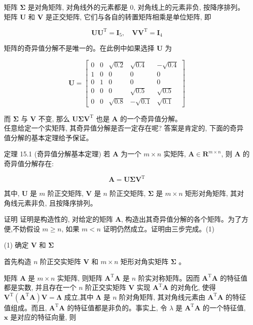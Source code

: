 \documentclass[10pt]{article}
\begin{document}
矩阵 $\boldsymbol{\Sigma}$ 是对角矩阵, 对角线外的元素都是 0, 对角线上的元素非负, 按降序排列。矩阵 $\boldsymbol{U}$ 和 $\boldsymbol{V}$ 是正交矩阵, 它们与各自的转置矩阵相乘是单位矩阵, 即

$$
\boldsymbol{U} \boldsymbol{U}^{\mathrm{T}}=\boldsymbol{I}_{5}, \quad \boldsymbol{V} \boldsymbol{V}^{\mathrm{T}}=\boldsymbol{I}_{4}
$$

矩阵的奇异值分解不是唯一的。在此例中如果选择 $\boldsymbol{U}$ 为

$$
\boldsymbol{U}=\left[\begin{array}{ccccc}
0 & 0 & \sqrt{0.2} & \sqrt{0.4} & -\sqrt{0.4} \\
1 & 0 & 0 & 0 & 0 \\
0 & 1 & 0 & 0 & 0 \\
0 & 0 & 0 & \sqrt{0.5} & \sqrt{0.5} \\
0 & 0 & \sqrt{0.8} & -\sqrt{0.1} & \sqrt{0.1}
\end{array}\right]
$$

而 $\boldsymbol{\Sigma}$ 与 $\boldsymbol{V}$ 不变, 那么 $\boldsymbol{U} \boldsymbol{\Sigma} \boldsymbol{V}^{\mathrm{T}}$ 也是 $\boldsymbol{A}$ 的一个奇异值分解。\\
任意给定一个实矩阵, 其奇异值分解是否一定存在呢? 答案是肯定的, 下面的奇异值分解的基本定理给予保证。

定理 15.1 (奇异值分解基本定理) 若 $\boldsymbol{A}$ 为一个 $m \times n$ 实矩阵, $\boldsymbol{A} \in \boldsymbol{R}^{m \times n}$, 则 $\boldsymbol{A}$ 的奇异值分解存在:


\begin{equation*}
\boldsymbol{A}=\boldsymbol{U} \boldsymbol{\Sigma} \boldsymbol{V}^{\mathrm{T}} \tag{15.2}
\end{equation*}


其中, $\boldsymbol{U}$ 是 $m$ 阶正交矩阵, $\boldsymbol{V}$ 是 $n$ 阶正交矩阵, $\boldsymbol{\Sigma}$ 是 $m \times n$ 矩形对角矩阵, 其对角线元素非负, 且按降序排列。

证明 证明是构造性的, 对给定的矩阵 $\boldsymbol{A}$, 构造出其奇异值分解的各个矩阵。为了方便,不妨假设 $m \geqslant n$, 如果 $m<n$ 证明仍然成立。证明由三步完成。(1)

(1) 确定 $\boldsymbol{V}$ 和 $\boldsymbol{\Sigma}$

首先构造 $n$ 阶正交实矩阵 $\boldsymbol{V}$ 和 $m \times n$ 矩形对角实矩阵 $\boldsymbol{\Sigma}$ 。

矩阵 $\boldsymbol{A}$ 是 $m \times n$ 实矩阵, 则矩阵 $\boldsymbol{A}^{\mathrm{T}} \boldsymbol{A}$ 是 $n$ 阶实对称矩阵。因而 $\boldsymbol{A}^{\mathrm{T}} \boldsymbol{A}$ 的特征值都是实数, 并且存在一个 $n$ 阶正交实矩阵 $\boldsymbol{V}$ 实现 $\boldsymbol{A}^{\mathrm{T}} \boldsymbol{A}$ 的对角化, 使得 $\boldsymbol{V}^{\mathrm{T}}\left(\boldsymbol{A}^{\mathrm{T}} \boldsymbol{A}\right) \boldsymbol{V}=\boldsymbol{\Lambda}$ 成立,其中 $\boldsymbol{\Lambda}$ 是 $n$ 阶对角矩阵, 其对角线元素由 $\boldsymbol{A}^{\mathrm{T}} \boldsymbol{A}$ 的特征值组成。而且, $\boldsymbol{A}^{\mathrm{T}} \boldsymbol{A}$ 的特征值都是非负的。事实上, 令 $\lambda$ 是 $\boldsymbol{A}^{\mathrm{T}} \boldsymbol{A}$ 的一个特征值, $\boldsymbol{x}$ 是对应的特征向量, 则
\end{document}
